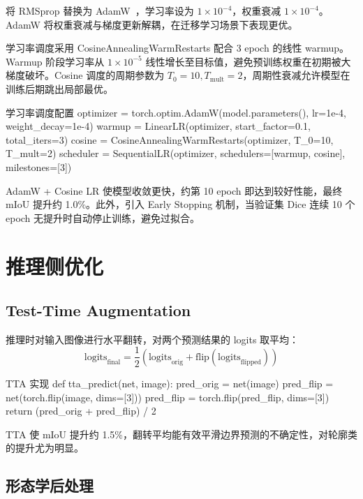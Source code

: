 将 RMSprop 替换为 AdamW~\cite{loshchilov2017adamw}，学习率设为 $1 \times 10^{-4}$，权重衰减 $1 \times 10^{-4}$。AdamW 将权重衰减与梯度更新解耦，在迁移学习场景下表现更优。

学习率调度采用 CosineAnnealingWarmRestarts 配合 3 epoch 的线性 warmup。Warmup 阶段学习率从 $1 \times 10^{-5}$ 线性增长至目标值，避免预训练权重在初期被大梯度破坏。Cosine 调度的周期参数为 $T_0=10, T_{\text{mult}}=2$，周期性衰减允许模型在训练后期跳出局部最优。

\begin{codeblock}{学习率调度配置}
optimizer = torch.optim.AdamW(model.parameters(),
    lr=1e-4, weight_decay=1e-4)
warmup = LinearLR(optimizer, start_factor=0.1,
    total_iters=3)
cosine = CosineAnnealingWarmRestarts(optimizer,
    T_0=10, T_mult=2)
scheduler = SequentialLR(optimizer,
    schedulers=[warmup, cosine], milestones=[3])
\end{codeblock}

AdamW + Cosine LR 使模型收敛更快，约第 10 epoch 即达到较好性能，最终 mIoU 提升约 1.0\%。此外，引入 Early Stopping 机制，当验证集 Dice 连续 10 个 epoch 无提升时自动停止训练，避免过拟合。

\section{推理侧优化}

\subsection{Test-Time Augmentation}

推理时对输入图像进行水平翻转，对两个预测结果的 logits 取平均：
\begin{equation}
    \text{logits}_{\text{final}} = \frac{1}{2} (\text{logits}_{\text{orig}} + \text{flip}(\text{logits}_{\text{flipped}}))
\end{equation}

\begin{codeblock}{TTA 实现}
def tta_predict(net, image):
    pred_orig = net(image)
    pred_flip = net(torch.flip(image, dims=[3]))
    pred_flip = torch.flip(pred_flip, dims=[3])
    return (pred_orig + pred_flip) / 2
\end{codeblock}

TTA 使 mIoU 提升约 1.5\%，翻转平均能有效平滑边界预测的不确定性，对轮廓类的提升尤为明显。

\subsection{形态学后处理}

